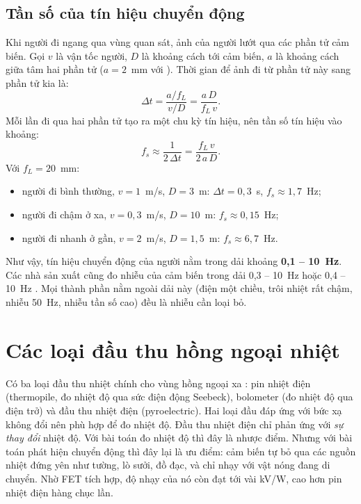 \subsection{Tần số của tín hiệu chuyển động}
\label{sec:tanso}

Khi người đi ngang qua vùng quan sát, ảnh của người lướt qua các phần tử cảm biến. Gọi $v$ là vận tốc người, $D$ là khoảng cách tới cảm biến, $a$ là khoảng cách giữa tâm hai phần tử ($a = 2$~mm với \PYD{}). Thời gian để ảnh đi từ phần tử này sang phần tử kia là:
\begin{equation}
  \Delta t = \frac{a/f_L}{v/D} = \frac{a\,D}{f_L\,v}.
  \label{eq:deltat}
\end{equation}
Mỗi lần đi qua hai phần tử tạo ra một chu kỳ tín hiệu, nên tần số tín hiệu vào khoảng:
\begin{equation}
  f_s \approx \frac{1}{2\,\Delta t} = \frac{f_L\,v}{2\,a\,D}.
  \label{eq:fs}
\end{equation}
Với $f_L = 20$~mm:
\begin{itemize}
  \item người đi bình thường, $v = 1$~m/s, $D = 3$~m: $\Delta t = 0{,}3$~s, $f_s \approx 1{,}7$~Hz;
  \item người đi chậm ở xa, $v = 0{,}3$~m/s, $D = 10$~m: $f_s \approx 0{,}15$~Hz;
  \item người đi nhanh ở gần, $v = 2$~m/s, $D = 1{,}5$~m: $f_s \approx 6{,}7$~Hz.
\end{itemize}
Như vậy, tín hiệu chuyển động của người nằm trong dải khoảng \textbf{0,1 -- 10~Hz}. Các nhà sản xuất cũng đo nhiễu của cảm biến trong dải 0,3 -- 10~Hz hoặc 0,4 -- 10~Hz \cite{pyd1378-ds,pyd1378}. Mọi thành phần nằm ngoài dải này (điện một chiều, trôi nhiệt rất chậm, nhiễu 50~Hz, nhiễu tần số cao) đều là nhiễu cần loại bỏ.

\section{Các loại đầu thu hồng ngoại nhiệt}

Có ba loại đầu thu nhiệt chính cho vùng hồng ngoại xa \cite{fraden}: pin nhiệt điện (thermopile, đo nhiệt độ qua sức điện động Seebeck), bolometer (đo nhiệt độ qua điện trở) và đầu thu nhiệt điện (pyroelectric). Hai loại đầu đáp ứng với bức xạ không đổi nên phù hợp để đo nhiệt độ. Đầu thu nhiệt điện chỉ phản ứng với \emph{sự thay đổi} nhiệt độ. Với bài toán đo nhiệt độ thì đây là nhược điểm. Nhưng với bài toán phát hiện chuyển động thì đây lại là ưu điểm: cảm biến tự bỏ qua các nguồn nhiệt đứng yên như tường, lò sưởi, đồ đạc, và chỉ nhạy với vật nóng đang di chuyển. Nhờ FET tích hợp, độ nhạy của nó còn đạt tới vài kV/W, cao hơn pin nhiệt điện hàng chục lần.

